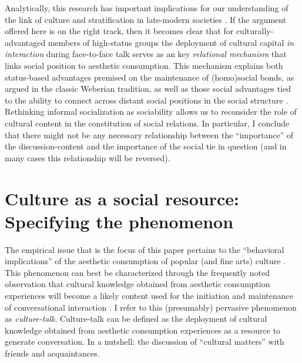 \documentclass[11pt]{article}
\begin{document}
Analytically, this research has important implications for our understanding of the link of culture and stratification in late-modern societies \citep{ollivier00}.  If the argument offered here is on the right track, then it becomes clear that for culturally-advantaged members of high-status groups the deployment of cultural capital \emph{in interaction} \citep{eliasoph_lichterman03} during face-to-face talk serves as an key \emph{relational mechanism} \citep{tilly98} that links social position to aesthetic consumption.  This mechanism explains both status-based advantages premised on the maintenance of (homo)social bonds, as argued in the classic Weberian tradition, as well as those social advantages tied to the ability to connect across distant social positions in the social structure \citep{erickson96, lizardo06a, lin99, pachuki_breiger10}.   Rethinking informal socialization as sociability allows us to reconsider the role of cultural content in the constitution of social relations.  In particular, I conclude that there might not be any necessary relationship between the ``importance'' of the discussion-content and the importance of the social tie in question (and in many cases this relationship will be reversed).

\section{Culture as a social resource:  Specifying the phenomenon}
The empirical issue that is the focus of this paper pertains to the ``behavioral implications'' of the aesthetic consumption of popular (and fine arts) culture \citep{fine77}.  This phenomenon can best be characterized through the frequently noted observation that cultural knowledge obtained from aesthetic consumption experiences will become a likely content used for the initiation and maintenance of conversational interaction \citep{dimaggio87, collins75}.  I refer to this (presumably) pervasive phenomenon as \emph{culture-talk}.  Culture-talk can be defined as the deployment of cultural knowledge obtained from aesthetic consumption experiences as a resource to generate conversation.  In a nutshell:  the discussion of ``cultural matters'' with friends and acquaintances.
\end{document}
